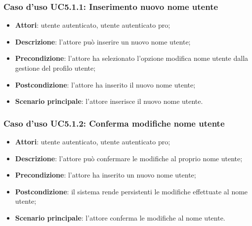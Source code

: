 \subsubsection{Caso d'uso UC5.1.1: Inserimento nuovo nome utente}

\begin{itemize}
	\item \textbf{Attori}: utente autenticato, utente autenticato pro;
	\item \textbf{Descrizione}: l'attore può inserire un nuovo nome utente;
	\item \textbf{Precondizione}: l'attore ha selezionato l'opzione modifica nome utente dalla gestione del profilo utente;
	\item \textbf{Postcondizione}: l'attore ha inserito il nuovo nome utente;
	\item \textbf{Scenario principale}: l'attore inserisce il nuovo nome utente.
\end{itemize}

\subsubsection{Caso d'uso UC5.1.2: Conferma modifiche nome utente}

\begin{itemize}
	\item \textbf{Attori}: utente autenticato, utente autenticato pro;
	\item \textbf{Descrizione}: l'attore può confermare le modifiche al proprio nome utente;
	\item \textbf{Precondizione}: l'attore ha inserito un nuovo nome utente;
	\item \textbf{Postcondizione}: il sistema rende persistenti le modifiche effettuate al nome utente;
	\item \textbf{Scenario principale}: l'attore conferma le modifiche al nome utente.
\end{itemize}

